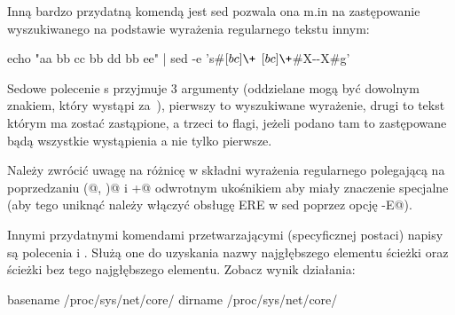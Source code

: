 Inną bardzo przydatną komendą jest sed pozwala ona m.in na zastępowanie
wyszukiwanego na podstawie wyrażenia regularnego tekstu innym:

\begin{CodeFrame*}[bash]{}
echo "aa bb cc bb dd bb ee" | sed -e 's#\([bc]\+\) \([bc]\+\)#X-\2-X#g'
\end{CodeFrame*}

Sedowe polecenie s przyjmuje 3 argumenty (oddzielane mogą być dowolnym znakiem,
który wystąpi za~\Verb@s@), pierwszy to wyszukiwane wyrażenie, drugi to tekst
którym ma zostać zastąpione, a trzeci to flagi, jeżeli podano tam \Verb@g@
to zastępowane bądą wszystkie wystąpienia a nie tylko pierwsze.

Należy zwrócić uwagę na różnicę w składni wyrażenia regularnego polegającą
na poprzedzaniu \Verb@(@, \Verb@)@ i \Verb@+@ odwrotnym ukośnikiem aby miały znaczenie specjalne
(aby tego uniknąć należy włączyć obsługę ERE w sed poprzez opcję \Verb@-E@).

Innymi przydatnymi komendami przetwarzającymi (specyficznej postaci) napisy są
polecenia \Verb@basename@ i \Verb@dirname@. Służą one do uzyskania nazwy najgłębszego elementu
ścieżki oraz ścieżki bez tego najgłębszego elementu. Zobacz wynik działania:

\begin{CodeFrame*}[bash]{}
basename /proc/sys/net/core/
dirname /proc/sys/net/core/
\end{CodeFrame*}

